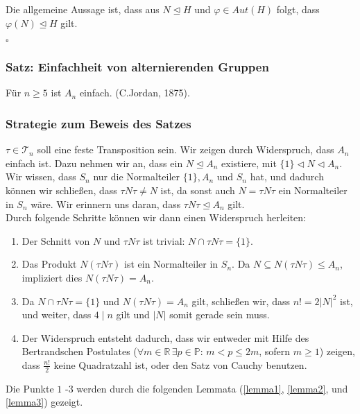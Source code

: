 \documentclass[12pt, german]{article}
\newcommand{\R}{\mathbb{R}}
\newcommand{\bewiesen}{
	
	\begin{flushright}
		$\square$  \\
\end{flushright}}
\begin{document}
	Die allgemeine Aussage ist, dass aus $N \trianglelefteq H$ und $\varphi \in Aut(H)$ folgt, dass $\varphi(N) \trianglelefteq H$ gilt. 
	\bewiesen
	
	\subsubsection{Satz: Einfachheit von alternierenden Gruppen}
	Für $n \geq 5$ ist $A_n$ einfach. (C.Jordan, 1875).
	
	\subsubsection{Strategie zum Beweis des Satzes}
	$\tau \in \mathcal T_n$ soll eine feste Transposition sein. Wir zeigen durch Widerspruch, dass $A_n$ einfach ist. Dazu nehmen wir an, dass ein $N \trianglelefteq A_n$ existiere, mit $\{1\} \triangleleft N \triangleleft A_n$.  \\
	
	Wir wissen, dass $S_n$ nur die Normalteiler $\{1\}, A_n$ und $S_n$ hat, und dadurch können wir schlie\ss en, dass $\tau N\tau \not = N$ ist, da sonst auch $N = \tau N \tau $ ein Normalteiler in $S_n$ wäre. Wir erinnern uns daran, dass $\tau N \tau \trianglelefteq A_n$ gilt. \\
	Durch folgende Schritte können wir dann einen Widerspruch herleiten: 
	
	\begin{enumerate}[label=\arabic*.]
		\item Der Schnitt von $N$ und $\tau N \tau$ ist trivial: $N \cap \tau N \tau = \{1\}$.
		\item Das Produkt $N(\tau N \tau)$ ist ein Normalteiler in $S_n$. Da $N \subseteq N(\tau N \tau) \leq A_n$, impliziert dies $N(\tau N \tau) = A_n$.
		\item Da $N\cap \tau N \tau =  \{1\}$ und $N(  \tau N \tau ) = A_n$ gilt, schlie\ss en wir, dass $n! = 2 |N|^2$ ist, und weiter, dass $4 \mid n$ gilt und $|N|$ somit gerade sein muss. 
		\item Der Widerspruch entsteht dadurch, dass wir entweder mit Hilfe des Bertrandschen Postulates ($\forall m \in \R\, \exists p \in \mathbb{P}: \, m < p \leq 2m$, sofern $m \geq 1$) zeigen, dass $\frac{n!}{2}$ keine Quadratzahl ist, oder den Satz von Cauchy benutzen. 
	\end{enumerate}
	Die Punkte $1$ -$3$ werden durch die folgenden Lemmata (\ref{lemma1}, \ref{lemma2}, und \ref{lemma3}) gezeigt. 
	
\end{document}
